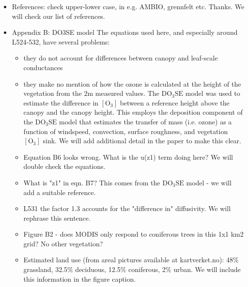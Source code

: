 \documentclass{scrartcl}
\begin{document}
\begin{itemize}
\item {\color{blue}References: check upper-lower case, in e.g. AMBIO, grennfelt etc.}
Thanks. We will check our list of references.
 
\item {\color{blue}Appendix B: DO3SE model
The equations used here, and especially around L524-532, have several problems:
\begin{itemize}
\item they do not account for differences between canopy and leaf-scale conductances
\item they make no mention of how the ozone is calculated at the height of the vegetation from the 2m measured values.
{\color{black}The $\mathrm{DO_3SE}$ model was used to estimate the difference in $[\mathrm{O_3}]$ between a reference height above the canopy and the canopy height. This employs the deposition component of the $\mathrm{DO_3SE}$ model that estimates the transfer of mass (i.e. ozone) as a function of windspeed, convection, surface roughness, and vegetation $[\mathrm{O_3}]$ sink. We will add additional detail in the paper to make this clear.}
\item Equation B6 looks wrong. What is the u(z1) term doing here?
{\color{black}We will double check the equations.}
\item What is "z1" in eqn. B7?
{\color{black}This comes from the $\mathrm{DO_3SE}$ model - we will add a suitable reference.}
\item L531 the factor 1.3 accounts for the "difference in" diffusivity.
{\color{black}We will rephrase this sentence.}
\item Figure B2 - does MODIS only respond to coniferous trees in this 1x1 km2 grid? No other vegetation?
\item  {\color{black}Estimated land use (from areal pictures available at kartverket.no): 48\% grassland, 32.5\% deciduous, 12.5\% coniferous, 2\% urban. We will include this information in the figure caption.}
\end{itemize}}
  

\end{itemize}
\end{document}
